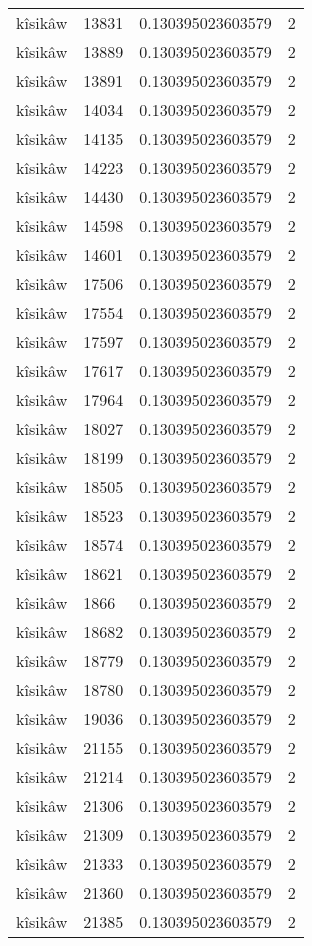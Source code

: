 \begin{longtable}{llll}
kîsikâw & 13831 & 0.130395023603579 & 2 \\
kîsikâw & 13889 & 0.130395023603579 & 2 \\
kîsikâw & 13891 & 0.130395023603579 & 2 \\
kîsikâw & 14034 & 0.130395023603579 & 2 \\
kîsikâw & 14135 & 0.130395023603579 & 2 \\
kîsikâw & 14223 & 0.130395023603579 & 2 \\
kîsikâw & 14430 & 0.130395023603579 & 2 \\
kîsikâw & 14598 & 0.130395023603579 & 2 \\
kîsikâw & 14601 & 0.130395023603579 & 2 \\
kîsikâw & 17506 & 0.130395023603579 & 2 \\
kîsikâw & 17554 & 0.130395023603579 & 2 \\
kîsikâw & 17597 & 0.130395023603579 & 2 \\
kîsikâw & 17617 & 0.130395023603579 & 2 \\
kîsikâw & 17964 & 0.130395023603579 & 2 \\
kîsikâw & 18027 & 0.130395023603579 & 2 \\
kîsikâw & 18199 & 0.130395023603579 & 2 \\
kîsikâw & 18505 & 0.130395023603579 & 2 \\
kîsikâw & 18523 & 0.130395023603579 & 2 \\
kîsikâw & 18574 & 0.130395023603579 & 2 \\
kîsikâw & 18621 & 0.130395023603579 & 2 \\
kîsikâw & 1866 & 0.130395023603579 & 2 \\
kîsikâw & 18682 & 0.130395023603579 & 2 \\
kîsikâw & 18779 & 0.130395023603579 & 2 \\
kîsikâw & 18780 & 0.130395023603579 & 2 \\
kîsikâw & 19036 & 0.130395023603579 & 2 \\
kîsikâw & 21155 & 0.130395023603579 & 2 \\
kîsikâw & 21214 & 0.130395023603579 & 2 \\
kîsikâw & 21306 & 0.130395023603579 & 2 \\
kîsikâw & 21309 & 0.130395023603579 & 2 \\
kîsikâw & 21333 & 0.130395023603579 & 2 \\
kîsikâw & 21360 & 0.130395023603579 & 2 \\
kîsikâw & 21385 & 0.130395023603579 & 2 \\

\end{longtable}
